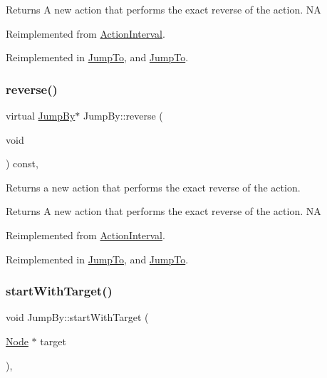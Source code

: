 \begin{DoxyReturn}{Returns}
A new action that performs the exact reverse of the action.  NA 
\end{DoxyReturn}


Reimplemented from \hyperlink{classActionInterval_a9f9ac7164036a0bc261a72f62a2b2da7}{Action\+Interval}.



Reimplemented in \hyperlink{classJumpTo_a56d2aef2280cbced862f0d7cf006f20e}{Jump\+To}, and \hyperlink{classJumpTo_adc71d1883b687ba53a86a5a42c20faa4}{Jump\+To}.

\mbox{\label{classJumpBy_ae177fcfe7008837b15fca646645d9396}} 
\subsubsection{\texorpdfstring{reverse()}{reverse()}\hspace{0.1cm}{\footnotesize\ttfamily [2/2]}}
{\footnotesize\ttfamily virtual \hyperlink{classJumpBy}{Jump\+By}$\ast$ Jump\+By\+::reverse (\begin{DoxyParamCaption}\item[{void}]{ }\end{DoxyParamCaption}) const\hspace{0.3cm}{\ttfamily [override]}, {\ttfamily [virtual]}}

Returns a new action that performs the exact reverse of the action.

\begin{DoxyReturn}{Returns}
A new action that performs the exact reverse of the action.  NA 
\end{DoxyReturn}


Reimplemented from \hyperlink{classActionInterval_a9f9ac7164036a0bc261a72f62a2b2da7}{Action\+Interval}.



Reimplemented in \hyperlink{classJumpTo_a56d2aef2280cbced862f0d7cf006f20e}{Jump\+To}, and \hyperlink{classJumpTo_adc71d1883b687ba53a86a5a42c20faa4}{Jump\+To}.

\mbox{\label{classJumpBy_a3b05635b8834c6269b249dc1247854e9}} 
\subsubsection{\texorpdfstring{start\+With\+Target()}{startWithTarget()}\hspace{0.1cm}{\footnotesize\ttfamily [1/2]}}
{\footnotesize\ttfamily void Jump\+By\+::start\+With\+Target (\begin{DoxyParamCaption}\item[{\hyperlink{classNode}{Node} $\ast$}]{target }\end{DoxyParamCaption})\hspace{0.3cm}{\ttfamily [override]}, {\ttfamily [virtual]}}

